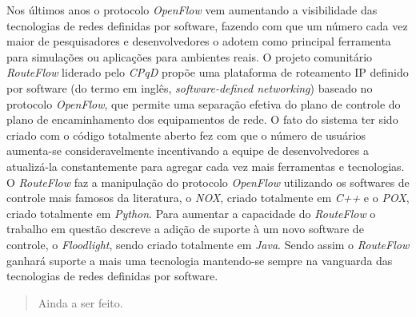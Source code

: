 \documentclass[dissertacao]{ppgccufscar}
\begin{document}
 

\capa
\folhaderosto
{}
\begin{folhadeaprovacao}
\end{folhadeaprovacao}

\begin{resumo}

Nos últimos anos o protocolo \textit{OpenFlow} vem aumentando a visibilidade das tecnologias de redes definidas por software, fazendo com que um número cada vez maior de pesquisadores e desenvolvedores o adotem como principal ferramenta para simulações ou aplicações para ambientes reais. O projeto comunitário \textit{RouteFlow} liderado pelo \textit{CPqD} propõe uma plataforma de roteamento IP definido por software (do termo em inglês, \textit{software-defined networking}) baseado no protocolo \textit{OpenFlow}, que permite uma separação efetiva do plano de controle do plano de encaminhamento dos equipamentos de rede. O fato do sistema ter sido criado com o código totalmente aberto fez com que o número de usuários aumenta-se consideravelmente incentivando a equipe de desenvolvedores a atualizá-la constantemente para agregar cada vez mais ferramentas e tecnologias. O \textit{RouteFlow} faz a manipulação do protocolo \textit{OpenFlow} utilizando os softwares de controle mais famosos da literatura, o \textit{NOX}, criado totalmente em \textit{C++} e o \textit{POX}, criado totalmente em \textit{Python}. Para aumentar a capacidade do \textit{RouteFlow} o trabalho em questão descreve a adição de suporte à um novo software de controle, o \textit{Floodlight}, sendo criado totalmente em \textit{Java}. Sendo assim o \textit{RouteFlow} ganhará suporte a mais uma tecnologia mantendo-se sempre na vanguarda das tecnologias de redes definidas por software.     

\end{resumo}

\begin{abstract}
Ainda a ser feito.

\end{abstract}

\listoffigures

\listofacronyms
\end{document}
